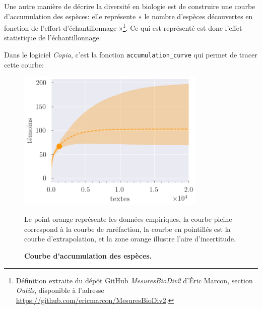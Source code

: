 \documentclass[a4paper,twoside,12pt]{book}
\begin{document}
Une autre manière de décrire la diversité en biologie est de construire une courbe d'accumulation des espèces: elle représente « le nombre d'espèces découvertes en fonction de l'effort d'échantillonnage »\footnote{Définition extraite du dépôt GitHub \textit{MesuresBioDiv2} d’Éric Marcon, section \textit{Outils}, disponible à l’adresse \url{https://github.com/ericmarcon/MesuresBioDiv2}.}. Ce qui est représenté est donc l'effet statistique de l'échantillonnage.

Dans le logiciel \textit{Copia}, c'est la fonction \texttt{accumulation\_curve} qui permet de tracer cette courbe: \\

\begin{figure}[H]
	\centering
	\includegraphics[width=0.8\textwidth]{img/accumulation.png}
	\caption{\textbf{Courbe d'accumulation des espèces. }}
	Le point orange représente les données empiriques, la courbe pleine correspond à la courbe de raréfaction, la courbe en pointillés est la courbe d’extrapolation, et la zone orange illustre l’aire d’incertitude.
	\label{fig:ton_label}
	\end{figure}
\end{document}
